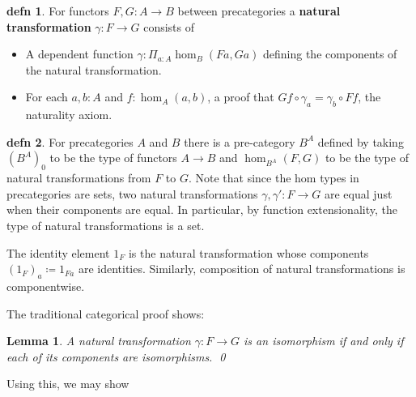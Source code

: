 \documentclass{amsart}
\theoremstyle{theorem}
\newtheorem*{lem}{Lemma}
\theoremstyle{definition}
\newtheorem*{defn}{defn}
\theoremstyle{remark}
\newcommand{\0}{\mathbbe{0}}
\newcommand{\1}{\mathbbe{1}}
\newcommand{\2}{\mathbbe{2}}
\newcommand{\3}{\mathbbe{3}}
\newcommand{\4}{\mathbbe{4}}
\begin{document}

\begin{defn} For functors $F,G: A \to B$ between precategories a \textbf{natural transformation} $\gamma \colon F \to G$ consists of
\begin{itemize}
\item A dependent function $\gamma : \Pi_{a:A} \hom_B(Fa,Ga)$ defining the components of the natural transformation.
\item For each $a,b :A$ and $f: \hom_A(a,b)$, a proof that $Gf \circ \gamma_a = \gamma_b \circ Ff$, the naturality axiom.
\end{itemize}
\end{defn}

\begin{defn} For precategories $A$ and $B$ there is a pre-category $B^A$ defined by taking $(B^A)_0$ to be the type of functors $A \to B$ and $\hom_{B^A}(F,G)$ to be the type of natural transformations from $F$ to $G$. Note that since the hom types in precategories are sets, two natural transformations $\gamma, \gamma' : F \to G$ are equal just when their components are equal. In particular, by function extensionality, the type of natural transformations is a set.

The identity element $1_F$ is the natural transformation whose components $(1_F)_a \coloneq 1_{Fa}$ are identities. Similarly, composition of natural transformations is componentwise.
\end{defn}

The traditional categorical proof shows:

\begin{lem} A natural transformation $\gamma \colon F \to G$ is an isomorphism if and only if each of its components are isomorphisms. \qed
\end{lem}

Using this, we may show
\end{document}
